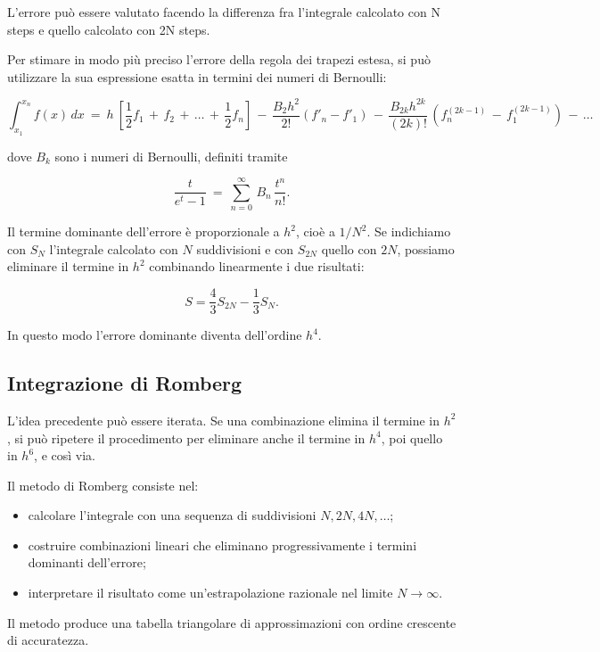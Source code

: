 \documentclass{article}
\begin{document}
	L'errore può essere valutato facendo la differenza fra l'integrale calcolato con N steps e quello calcolato con 2N steps.
	
	Per stimare in modo più preciso l’errore della regola dei trapezi estesa, si può utilizzare la sua espressione esatta in termini dei numeri di Bernoulli:
	
	\[
	\int_{x_1}^{x_n} f(x)\,dx
	\ =\
	h\ \left[
	\frac{1}{2}f_1\, +\, f_2\, +\, \dots\, +\, \frac{1}{2}f_n
	\right]
	\,-\,
	\frac{B_2 h^2}{2!}\left(f'_n - f'_1\right)
	\,-\,
	\frac{B_{2k} h^{2k}}{(2k)!}\,
	\left(f^{(2k-1)}_n\, -\, f^{(2k-1)}_1\right)
	\,-\, \dots
	\]
	
	dove $B_k$ sono i numeri di Bernoulli, definiti tramite
	
	\[
	\frac{t}{e^t - 1}
	\ =\
	\sum_{n=0}^{\infty}\, B_n\, \frac{t^n}{n!}.
	\]
	
	Il termine dominante dell’errore è proporzionale a $h^2$, cioè a $1/N^2$. Se indichiamo con $S_N$ l’integrale calcolato con $N$ suddivisioni e con $S_{2N}$ quello con $2N$, possiamo eliminare il termine in $h^2$ combinando linearmente i due risultati:
	
	\[
	S = \frac{4}{3} S_{2N} - \frac{1}{3} S_N.
	\]
	
	In questo modo l’errore dominante diventa dell’ordine $h^4$.
	
	\subsection{Integrazione di Romberg}
	
	L’idea precedente può essere iterata. Se una combinazione elimina il termine in $h^2$, si può ripetere il procedimento per eliminare anche il termine in $h^4$, poi quello in $h^6$, e così via.
	
	Il metodo di Romberg consiste nel:
	
	\begin{itemize}
		\item calcolare l’integrale con una sequenza di suddivisioni $N, 2N, 4N, \dots$;
		\item costruire combinazioni lineari che eliminano progressivamente i termini dominanti dell’errore;
		\item interpretare il risultato come un’estrapolazione razionale nel limite $N \to \infty$.
	\end{itemize}
	
	Il metodo produce una tabella triangolare di approssimazioni con ordine crescente di accuratezza.
	
\end{document}

